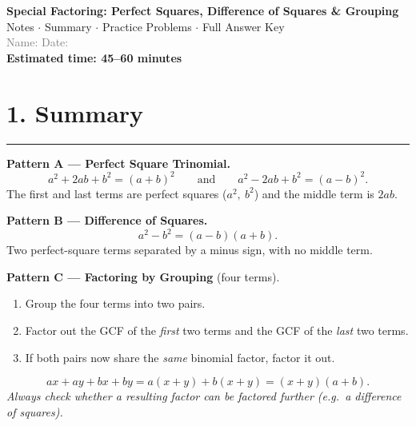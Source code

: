 \documentclass[11pt]{article}
\newcommand{\sectionrule}{\vspace{2pt}\hrule\vspace{8pt}}
\begin{document}
\begin{center}
{\Large\textbf{\textcolor{brandpurple}{Special Factoring: Perfect Squares, Difference of Squares \& Grouping}}}\\[3pt]
{\small Notes $\cdot$ Summary $\cdot$ Practice Problems $\cdot$ Full Answer Key}\\[2pt]
{\footnotesize \textcolor{gray}{Name: \underline{\hspace{4cm}} \qquad Date: \underline{\hspace{3cm}}}}\\[3pt]
{\footnotesize \textcolor{brandblue}{\textbf{Estimated time: 45--60 minutes}}}
\end{center}

\vspace{4pt}

\section*{\textcolor{brandpurple}{1. Summary}}
\sectionrule

\noindent\textbf{Pattern A --- Perfect Square Trinomial.}
\[
a^2 + 2ab + b^2 = (a+b)^2 \qquad\text{and}\qquad a^2 - 2ab + b^2 = (a-b)^2 .
\]
The first and last terms are perfect squares ($a^2,\ b^2$) and the middle term is $2ab$.

\medskip
\noindent\textbf{Pattern B --- Difference of Squares.}
\[
a^2 - b^2 = (a-b)(a+b).
\]
Two perfect-square terms separated by a minus sign, with no middle term.

\medskip
\noindent\textbf{Pattern C --- Factoring by Grouping} (four terms).
\begin{enumerate}[label=(\arabic*),leftmargin=2em,itemsep=1pt]
  \item Group the four terms into two pairs.
  \item Factor out the GCF of the \emph{first} two terms and the GCF of the \emph{last} two terms.
  \item If both pairs now share the \emph{same} binomial factor, factor it out.
\end{enumerate}
\[
ax + ay + bx + by = a(x+y) + b(x+y) = (x+y)(a+b).
\]
\textit{Always check whether a resulting factor can be factored further (e.g.\ a difference of squares).}

\begin{center}
\quad
{}\quad
{}
\end{center}
\end{document}
